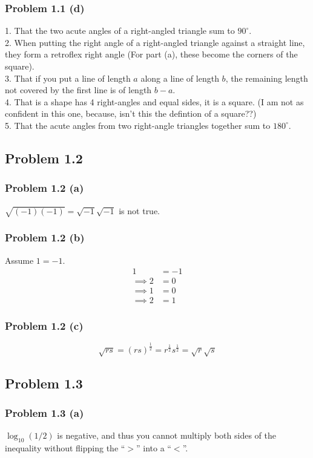 \documentclass{article}
\begin{document}
\subsubsection{Problem 1.1 (d)}
1. That the two acute angles of a right-angled triangle sum to $90^{\circ}$.\\
2. When putting the right angle of a right-angled triangle against a straight line, they form a retroflex right angle (For part (a), these become the corners of the square).\\
3. That if you put a line of length $a$ along a line of length $b$, the remaining length not covered by the first line is of length $b-a$.\\
4. That is a shape has 4 right-angles and equal sides, it is a square. (I am not as confident in this one, because, isn't this the defintion of a square??)\\
5. That the acute angles from two right-angle triangles together sum to $180^{\circ}$.
\subsection{Problem 1.2}
\subsubsection{Problem 1.2 (a)}
$\sqrt{(-1)(-1)}=\sqrt{-1}\sqrt{-1}$ is not true.
\subsubsection{Problem 1.2 (b)}
Assume $1=-1$.
\begin{align}
  1 &= -1 \\
  \implies 2 &= 0 \\
  \implies 1 &= 0 \\
  \implies 2 &= 1
\end{align}
\subsubsection{Problem 1.2 (c)}
$$\sqrt{rs} = (rs)^{\frac{1}{2}} = r^{\frac{1}{2}}s^{\frac{1}{2}} = \sqrt{r}\sqrt{s}$$
\subsection{Problem 1.3}
\subsubsection{Problem 1.3 (a)}
$\log_{10}{(1/2)}$ is negative, and thus you cannot multiply both sides of the inequality without flipping the ``$>$'' into a ``$<$''.
\end{document}
